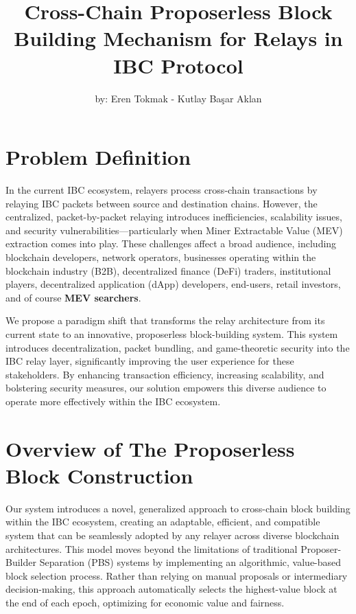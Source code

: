 \documentclass{article}
\begin{document}
\title{Cross-Chain Proposerless Block Building Mechanism for Relays in IBC Protocol}
\author{by: Eren Tokmak - Kutlay Başar Aklan}
\date{}

\maketitle

\section{Problem Definition}

In the current IBC ecosystem, relayers process cross-chain transactions by relaying IBC packets between source and destination chains. However, the centralized, packet-by-packet relaying introduces inefficiencies, scalability issues, and security vulnerabilities---particularly when Miner Extractable Value (MEV) extraction comes into play. These challenges affect a broad audience, including blockchain developers, network operators, businesses operating within the blockchain industry (B2B), decentralized finance (DeFi) traders, institutional players, decentralized application (dApp) developers, end-users, retail investors, and of course \textbf{MEV searchers}.

We propose a paradigm shift that transforms the relay architecture from its current state to an innovative, proposerless block-building system. This system introduces decentralization, packet bundling, and game-theoretic security into the IBC relay layer, significantly improving the user experience for these stakeholders. By enhancing transaction efficiency, increasing scalability, and bolstering security measures, our solution empowers this diverse audience to operate more effectively within the IBC ecosystem.

\section{Overview of The Proposerless Block Construction}

Our system introduces a novel, generalized approach to cross-chain block building within the IBC ecosystem, creating an adaptable, efficient, and compatible system that can be seamlessly adopted by any relayer across diverse blockchain architectures. This model moves beyond the limitations of traditional Proposer-Builder Separation (PBS) systems by implementing an algorithmic, value-based block selection process. Rather than relying on manual proposals or intermediary decision-making, this approach automatically selects the highest-value block at the end of each epoch, optimizing for economic value and fairness.
\end{document}
